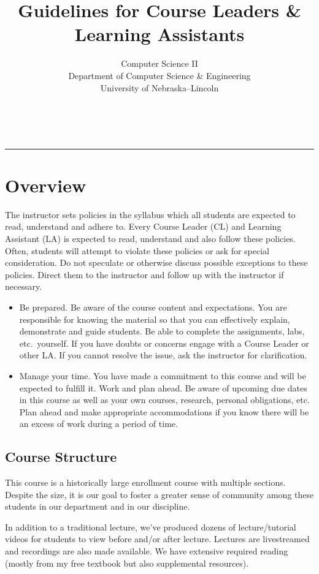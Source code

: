\documentclass[12pt]{scrartcl}
\title{Guidelines for Course Leaders \& Learning Assistants}\let\Title\@title
\subtitle{Computer Science II\\
{\small
\vskip1cm
Department of Computer Science \& Engineering \\
University of Nebraska--Lincoln}
\vskip-1cm}
\date{~}
\begin{document}
\maketitle


\hrule

\section*{Overview}

The instructor sets policies in the syllabus which all students 
are expected to read, understand and adhere to. Every Course Leader
(CL) and Learning Assistant (LA) is expected to read, understand 
and also follow these policies.  Often, students will attempt to 
violate these policies or ask for special consideration.  Do not 
speculate or otherwise discuss possible exceptions to these policies.  
Direct them to the instructor and follow up with the instructor if 
necessary.

\begin{itemize}
  \item Be prepared.  Be aware of the course content and expectations.
  You are responsible for knowing the material so that you can effectively
  explain, demonstrate and guide students.  Be able to complete the assignments, 
  labs, etc.\ yourself.  If you have doubts or concerns engage with
  a Course Leader or other LA.  If you cannot resolve the issue, ask the 
  instructor for clarification.
  \item Manage your time.  You have made a commitment to this course and
  will be expected to fulfill it.  Work and plan ahead.  Be aware of 
  upcoming due dates in this course as well as your own courses, research, 
  personal obligations, etc.  Plan ahead and make appropriate accommodations 
  if you know there will be an excess of work during a period of time.
\end{itemize}

\subsection*{Course Structure}

This course is a historically large enrollment course with
multiple sections.  
Despite the size, it is our goal to foster a greater sense of 
community among these students in our department and in our 
discipline.  

In addition to a traditional lecture, we've produced dozens of 
lecture/tutorial videos for students to view before and/or after lecture. 
Lectures are livestreamed and recordings are also made available.
We have extensive required reading (mostly from my free textbook but 
also supplemental resources).  
\end{document}
